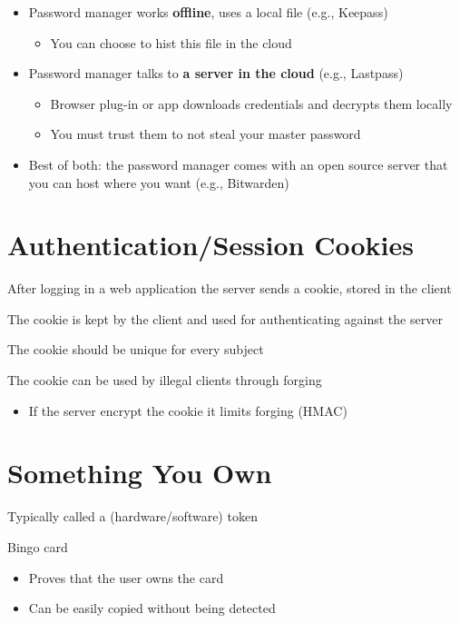 \documentclass[11pt]{article}
\begin{document}
\begin{itemize}
	\item Password manager works \textbf{offline}, uses a local file (e.g., Keepass)
		\begin{itemize}
			\item You can choose to hist this file in the cloud
		\end{itemize}
	\item Password manager talks to \textbf{a server in the cloud} (e.g., Lastpass)
		\begin{itemize}
			\item Browser plug-in or app downloads credentials and decrypts them locally
			\item You must trust them to not steal your master password
		\end{itemize}
	\item Best of both: the password manager comes with an open source server that you can host where you want (e.g., Bitwarden) 
\end{itemize}

\section*{Authentication/Session Cookies}

After logging in a web application the server sends a cookie, stored in the client

The cookie is kept by the client and used for authenticating against the server

The cookie should be unique for every subject

The cookie can be used by illegal clients through forging

\begin{itemize}
	\item If the server encrypt the cookie it limits forging (HMAC)
\end{itemize}

\section*{Something You Own}

Typically called a (hardware/software) token

Bingo card
\begin{itemize}
	\item Proves that the user owns the card
	\item Can be easily copied without being detected 
\end{itemize}
\end{document}
